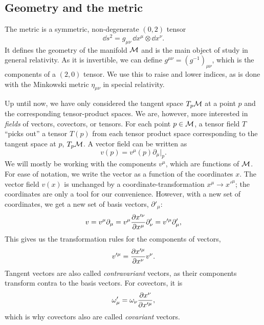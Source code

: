 \subsection{Geometry and the metric}
\label{subsection: goemetry and the metric}

The metric is a symmetric, non-degenerate $(0, 2)$ tensor
%
\begin{equation}
    \dd s^2 = g_{\mu \nu} \, \dd x^\mu \otimes \dd x^\nu.
\end{equation}
%
It defines the geometry of the manifold $\mathcal M$ and is the main object of study in general relativity.
As it is invertible, we can define $g^{\mu \nu} = (g^{-1})_{\mu \nu}$, which is the components of a $(2, 0)$ tensor.
We use this to raise and lower indices, as is done with the Minkowski metric $\eta_{\mu \nu}$ in special relativity.

Up until now, we have only considered the tangent space $T_p \mathcal M$ at a point $p$ and the corresponding tensor-product spaces.
We are, however, more interested in \emph{fields} of vectors, covectors, or tensors.
For each point $p \in \mathcal M$, a tensor field $T$ ``picks out'' a tensor $T(p)$ from each tensor product space corresponding to the tangent space at $p$, $T_p \mathcal M$.
A vector field can be written as
%
\begin{equation}
    v(p) = v^\mu(p) \partial_\mu |_p. 
\end{equation}
%
We will mostly be working with the components $v^\mu$, which are functions of $\mathcal M$.
For ease of notation, we write the vector as a function of the coordinates $x$.
The vector field $v(x)$ is unchanged by a coordinate-transformation $x^\mu \rightarrow {x'}^\mu$; the coordinates are only a tool for our convenience.
However, with a new set of coordinates, we get a new set of basis vectors, $\partial'_\mu$:
%
\begin{equation}
    v = v^\mu \partial_\mu = v^\mu \pdv{x'^\nu}{x^\mu} \partial'_\nu
    = v'^\mu \partial_\mu',
\end{equation}
%
This gives us the transformation rules for the components of vectors,
%
\begin{equation}
    v'^\mu = \pdv{x'^\mu}{x^\nu} v^\nu.
\end{equation}
%
Tangent vectors are also called \emph{contravariant} vectors, as their components transform contra to the basis vectors.
For covectors, it is
%
\begin{equation}
    \omega'_\mu = \omega_\nu \pdv{x^\nu}{x'^\mu},
\end{equation}
%
which is why covectors also are called \emph{covariant} vectors.

